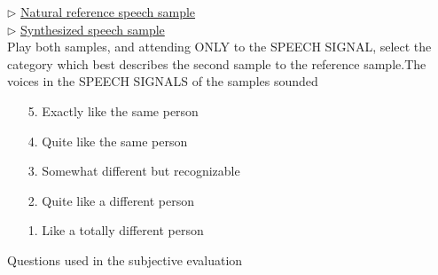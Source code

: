 \begin{table}[width=8cm]
\begin{framed}
\begin{itemize}
	\end{itemize}
	\end{framed}
	\begin{framed}
	$\rhd$ \underline{Natural reference speech sample}\\
	$\rhd$ \underline{Synthesized speech sample}\\
	Play both samples, and attending ONLY to the SPEECH SIGNAL, select the category which best describes the second sample to the reference sample.The voices in the SPEECH SIGNALS of the samples sounded
	\begin{itemize}
	\item[5.] Exactly like the same person
	\item[4.] Quite like the same person
	\item[3.] Somewhat different but recognizable
	\item[2.]Quite like a different person
	\item[1.] Like a totally different person
	\end{itemize}
	\end{framed}
\caption{Questions used in the subjective evaluation}
\label{table:test_questions}
\end{table}